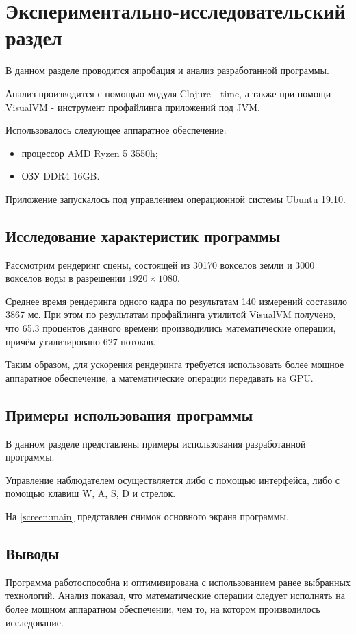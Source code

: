 \chapter{Экспериментально-исследовательский раздел}
\label{cha:research}

В данном разделе проводится апробация и анализ разработанной программы.


Анализ производится с помощью модуля Clojure - time, а также при помощи
VisualVM - инструмент профайлинга приложений под JVM.

Использовалось следующее аппаратное обеспечение:
\begin{itemize}
    \item процессор AMD Ryzen 5 3550h;
    \item ОЗУ DDR4 16GB.
\end{itemize}

Приложение запускалось под управлением операционной системы Ubuntu 19.10.

\section{Исследование характеристик программы}

Рассмотрим рендеринг сцены, состоящей из 30170 вокселов земли и 3000 вокселов воды
в разрешении $1920 \times 1080$.

Среднее время рендеринга одного кадра по результатам 140 измерений составило
3867 мс. При этом по результатам профайлинга утилитой VisualVM получено, что 65.3 процентов данного времени производились математические операции, причём утилизировано 627 потоков.

Таким образом, для ускорения рендеринга требуется использовать более мощное аппаратное обеспечение,
а математические операции передавать на GPU.

\section{Примеры использования программы}

В данном разделе представлены примеры использования разработанной программы.

Управление наблюдателем осуществляется либо с помощью интерфейса, либо с помощью
клавиш W, A, S, D и стрелок.

На \ref{screen:main} представлен снимок основного экрана программы.

\section{Выводы}

Программа работоспособна и оптимизирована с использованием ранее выбранных технологий.
Анализ показал, что математические операции следует исполнять на более мощном аппаратном обеспечении,
чем то, на котором производилось исследование.

